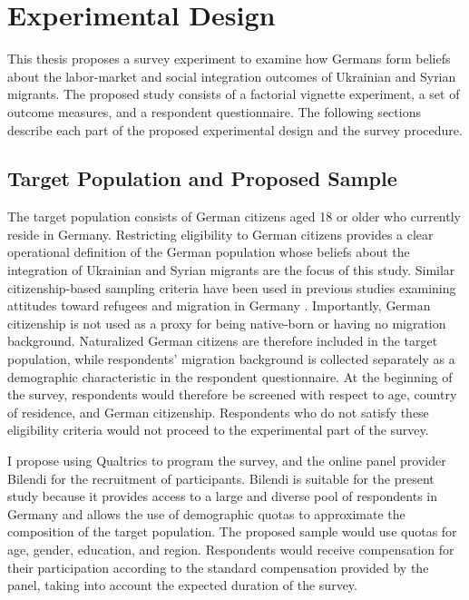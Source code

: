 \section{Experimental Design}

This thesis proposes a survey experiment to examine how Germans form beliefs about the labor-market and social 
integration outcomes of Ukrainian and Syrian migrants. The proposed study consists of a factorial vignette experiment, 
a set of outcome measures, and a respondent questionnaire. The following sections describe each part of 
the proposed experimental design and the survey procedure.

\subsection{Target Population and Proposed Sample}

The target population consists of German citizens aged 18 or older who currently reside in Germany. Restricting 
eligibility to German citizens provides a clear operational definition of the German population whose beliefs about 
the integration of Ukrainian and Syrian migrants are the focus of this study. Similar citizenship-based sampling 
criteria have been used in previous studies examining attitudes toward refugees and migration in Germany 
\citep[e.g.,][]{hayo2023between}. Importantly, German citizenship is not used as a proxy for being native-born or 
having no migration background. Naturalized German citizens are therefore included in the target population, while 
respondents’ migration background is collected separately as a demographic characteristic in the respondent questionnaire.
At the beginning of the survey, respondents would therefore be screened with respect to age, country of residence, 
and German citizenship. Respondents who do not satisfy these eligibility criteria would not proceed to the experimental 
part of the survey.

I propose using Qualtrics to program the survey, and the online panel provider Bilendi for the recruitment of 
participants. Bilendi is suitable for the present study because it provides access to a large and diverse pool of 
respondents in Germany and allows the use of demographic quotas to approximate the composition of the target 
population. The proposed sample would use quotas for age, gender, education, and region. Respondents would receive 
compensation for their participation according to the standard compensation provided by the panel, taking into account 
the expected duration of the survey.

